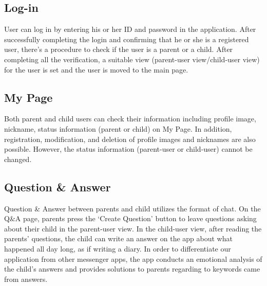 \documentclass[conference]{IEEEtran}
\begin{document}
\subsection{Log-in}
User can log in by entering his or her ID and password in the application. After successfully completing the login and confirming that he or she is a registered user, there’s a procedure to check if the user is a parent or a child. After completing all the verification, a suitable view (parent-user view/child-user view) for the user is set and the user is moved to the main page.
\vspace{0.5cm}
\subsection{My Page}
Both parent and child users can check their information including profile image, nickname, status information (parent or child) on My Page. In addition, registration, modification, and deletion of profile images and nicknames are also possible. However, the status information (parent-user or child-user) cannot be changed.
\vspace{0.5cm}
\subsection{Question \& Answer}
Question \& Answer between parents and child utilizes the format of chat. On the Q\&A page, parents press the ‘Create Question’ button to leave questions asking about their child in the parent-user view. In the child-user view, after reading the parents' questions, the child can write an answer on the app about what happened all day long, as if writing a diary. In order to differentiate our application from other messenger apps, the app conducts an emotional analysis of the child's answers and provides solutions to parents regarding to keywords came from answers.
\end{document}
